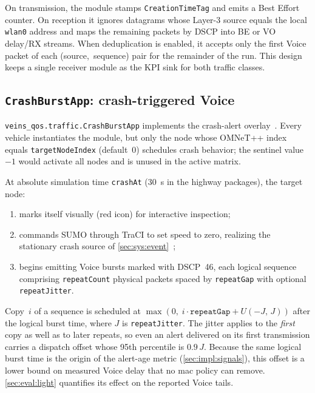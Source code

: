 On transmission, the module stamps \texttt{CreationTimeTag} and emits a Best Effort counter.
On reception it ignores datagrams whose Layer-3 source equals the local \texttt{wlan0} address and maps the remaining packets by DSCP into BE or VO delay/RX streams.
When deduplication is enabled, it accepts only the first Voice packet of each (source,~sequence) pair for the remainder of the run.
This design keeps a single receiver module as the KPI sink for both traffic classes.

\subsection{\texttt{CrashBurstApp}: crash-triggered Voice}
\label{sec:impl:crash}

\texttt{veins\_qos.traffic.CrashBurstApp} implements the crash-alert overlay~\cite{RFC3246_EF_PHB,aguiar2026_veins_qos}.
Every vehicle instantiates the module, but only the node whose OMNeT++ index equals \texttt{targetNodeIndex} (default~0) schedules crash behavior; the sentinel value~$-1$ would activate all nodes and is unused in the active matrix.

At absolute simulation time \texttt{crashAt} (30~s in the highway packages), the target node:

\begin{enumerate}
  \item marks itself visually (red icon) for interactive inspection;
  \item commands SUMO through TraCI to set speed to zero, realizing the stationary crash source of \autoref{sec:sys:event}~\cite{veins_sommer2011,lopez2018sumo};
  \item begins emitting Voice bursts marked with DSCP~46, each logical sequence comprising \texttt{repeatCount} physical packets spaced by \texttt{repeatGap} with optional \texttt{repeatJitter}.
\end{enumerate}

Copy~$i$ of a sequence is scheduled at $\max(0,\; i\cdot\texttt{repeatGap} + U(-J,\,J))$ after the logical burst time, where $J$ is \texttt{repeatJitter}.
The jitter applies to the \emph{first} copy as well as to later repeats, so even an alert delivered on its first transmission carries a dispatch offset whose 95th percentile is $0.9\,J$.
Because the same logical burst time is the origin of the alert-age metric (\autoref{sec:impl:signals}), this offset is a lower bound on measured Voice delay that no \gls{mac} policy can remove.
\autoref{sec:eval:light} quantifies its effect on the reported Voice tails.

